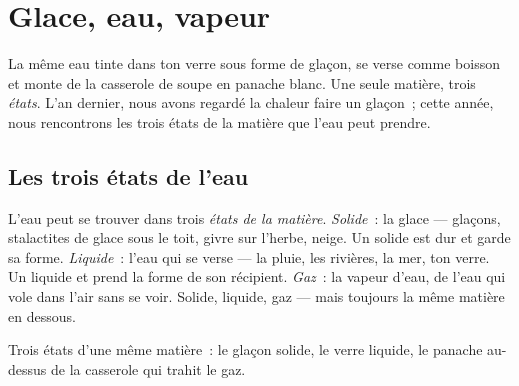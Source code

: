 \chapter{Glace, eau, vapeur}\label{ch:g2:ice-water-steam}

La même eau tinte dans ton verre sous forme de glaçon, se verse comme
boisson et monte de la casserole de soupe en panache blanc. Une seule
matière, trois \emph{états}. L'an dernier, nous avons regardé la
chaleur faire  un glaçon~; cette année, nous rencontrons les
trois états de la matière que l'eau peut prendre.

\section{Les trois états de l'eau}

\begin{example}\label{ex:g2:ice-water-steam:where}
L'eau peut se trouver dans trois \emph{états de la matière}.
\emph{Solide}~: la glace --- glaçons, stalactites de glace sous le
toit, givre sur l'herbe, neige. Un solide est dur et garde sa forme.
\emph{Liquide}~: l'eau qui se verse --- la pluie, les rivières, la
mer, ton verre. Un liquide  et prend la forme de son récipient.
\emph{Gaz}~: la vapeur d'eau, de l'eau qui vole dans l'air sans se
voir. Solide, liquide, gaz --- mais toujours la même matière en
dessous.
\end{example}

\begin{omfigure}

{\small Trois états d'une même matière~: le glaçon solide, le verre
liquide, le panache au-dessus de la casserole qui trahit le gaz.}
\end{omfigure}

